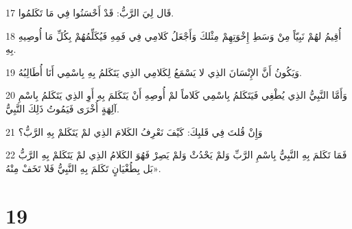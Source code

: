 \par 17 قَال لِيَ الرَّبُّ: قَدْ أَحْسَنُوا فِي مَا تَكَلمُوا.
\par 18 أُقِيمُ لهُمْ نَبِيّاً مِنْ وَسَطِ إِخْوَتِهِمْ مِثْلكَ وَأَجْعَلُ كَلامِي فِي فَمِهِ فَيُكَلِّمُهُمْ بِكُلِّ مَا أُوصِيهِ بِهِ.
\par 19 وَيَكُونُ أَنَّ الإِنْسَانَ الذِي لا يَسْمَعُ لِكَلامِي الذِي يَتَكَلمُ بِهِ بِاسْمِي أَنَا أُطَالِبُهُ.
\par 20 وَأَمَّا النَّبِيُّ الذِي يُطْغِي فَيَتَكَلمُ بِاسْمِي كَلاماً لمْ أُوصِهِ أَنْ يَتَكَلمَ بِهِ أَوِ الذِي يَتَكَلمُ بِاسْمِ آلِهَةٍ أُخْرَى فَيَمُوتُ ذَلِكَ النَّبِيُّ.
\par 21 وَإِنْ قُلتَ فِي قَلبِكَ: كَيْفَ نَعْرِفُ الكَلامَ الذِي لمْ يَتَكَلمْ بِهِ الرَّبُّ؟
\par 22 فَمَا تَكَلمَ بِهِ النَّبِيُّ بِاسْمِ الرَّبِّ وَلمْ يَحْدُثْ وَلمْ يَصِرْ فَهُوَ الكَلامُ الذِي لمْ يَتَكَلمْ بِهِ الرَّبُّ بَل بِطُغْيَانٍ تَكَلمَ بِهِ النَّبِيُّ فَلا تَخَفْ مِنْهُ».

\chapter{19}

